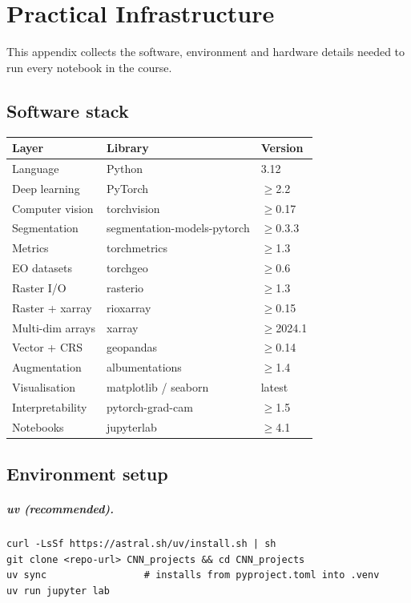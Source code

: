 \chapter{Practical Infrastructure}
\label{app:infra}

This appendix collects the software, environment and hardware details needed to
run every notebook in the course.

\section{Software stack}

\begin{center}\small
\renewcommand{\arraystretch}{1.15}
\begin{tabular}{@{}lll@{}}
\toprule
Layer & Library & Version\\
\midrule
Language & Python & 3.12\\
Deep learning & PyTorch & $\geq$2.2\\
Computer vision & torchvision & $\geq$0.17\\
Segmentation & segmentation-models-pytorch & $\geq$0.3.3\\
Metrics & torchmetrics & $\geq$1.3\\
EO datasets & torchgeo & $\geq$0.6\\
Raster I/O & rasterio & $\geq$1.3\\
Raster + xarray & rioxarray & $\geq$0.15\\
Multi-dim arrays & xarray & $\geq$2024.1\\
Vector + CRS & geopandas & $\geq$0.14\\
Augmentation & albumentations & $\geq$1.4\\
Visualisation & matplotlib / seaborn & latest\\
Interpretability & pytorch-grad-cam & $\geq$1.5\\
Notebooks & jupyterlab & $\geq$4.1\\
\bottomrule
\end{tabular}
\end{center}

\section{Environment setup}

\paragraph{uv (recommended).}
\begin{lstlisting}
curl -LsSf https://astral.sh/uv/install.sh | sh
git clone <repo-url> CNN_projects && cd CNN_projects
uv sync                 # installs from pyproject.toml into .venv
uv run jupyter lab
\end{lstlisting}

